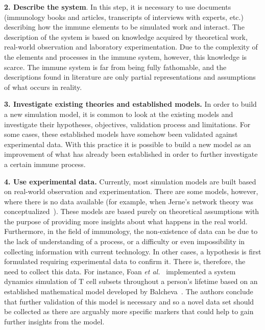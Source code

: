 \documentclass{llncs}
\begin{document}
{\bf 2. Describe the system}. In this step, it is necessary to use documents (immunology books and articles, transcripts of interviews with experts, etc.) describing how the immune elements to be simulated work and interact. The description of the system is based on knowledge acquired by theoretical work, real-world observation and laboratory experimentation. Due to the complexity of the elements and processes in the immune system, however, this knowledge is scarce. The immune system is far from being fully fathomable, and the descriptions found in literature are only partial representations and assumptions of what occurs in reality.

{\bf 3. Investigate existing theories and established models.} In order to build a new simulation model, it is common to look at the existing models and investigate their hypotheses, objectives, validation process and limitations. For some cases, these established models have somehow been validated against experimental data. With this practice it is possible to build a new model as an improvement of what has already been established in order to further investigate a certain immune process.

{\bf 4. Use experimental data.} Currently, most simulation models are built based on real-world observation and experimentation. There are some models, however, where there is no data available (for example, when Jerne's network theory was conceptualized~\cite{Jerne:1974}). These models are based purely on theoretical assumptions with the purpose of providing more insights about what happens in the real world. Furthermore, in the field of immunology, the non-existence of data can be due to the lack of understanding of a process, or a difficulty or even impossibility in collecting information with current technology. In other cases, a hypothesis is first formulated requiring experimental data to confirm it. There is, therefore, the need to collect this data. For instance, Foan {\it et al.}~\cite{Foan:2011} implemented a system dynamics simulation of T cell subsets throughout a person's lifetime based on an established mathematical model developed by Balcheva~\cite{Baltcheva:2010}. The authors conclude that further validation of this model is necessary and so a novel data set should be collected as there are arguably more specific markers that could help to gain further insights from the model.
\end{document}
